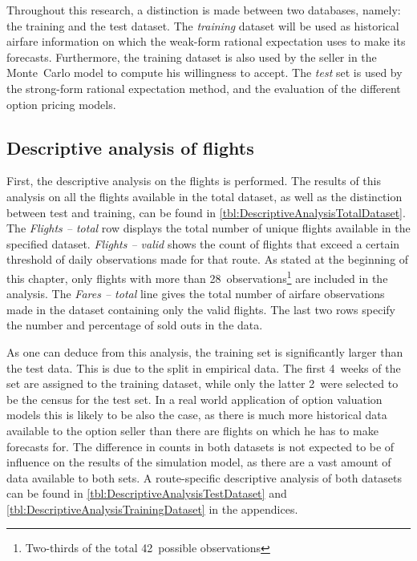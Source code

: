 Throughout this research, a distinction is made between two databases, namely: the training and the test dataset. The \emph{training} dataset will be used as historical airfare information on which the weak-form rational expectation uses to make its forecasts. Furthermore, the training dataset is also used by the seller in the Monte~Carlo model to compute his willingness to accept. The \emph{test} set is used by the strong-form rational expectation method, and the evaluation of the different option pricing models.

\subsection{Descriptive analysis of flights}
First, the descriptive analysis on the flights is performed. The results of this analysis on all the flights available in the total dataset, as well as the distinction between test and training, can be found in \autoref{tbl:DescriptiveAnalysisTotalDataset}. The \emph{Flights -- total} row displays the total number of unique flights available in the specified dataset. \emph{Flights -- valid} shows the count of flights that exceed a certain threshold of daily observations made for that route. As stated at the beginning of this chapter, only flights with more than 28~observations\footnote{Two-thirds of the total 42~possible observations} are included in the analysis. The \emph{Fares -- total} line gives the total number of airfare observations made in the dataset containing only the valid flights. The last two rows specify the number and percentage of sold outs in the data.

As one can deduce from this analysis, the training set is significantly larger than the test data. This is due to the split in empirical data. The first 4~weeks of the set are assigned to the training dataset, while only the latter 2~were selected to be the census for the test set. In a real world application of option valuation models this is likely to be also the case, as there is much more historical data available to the option seller than there are flights on which he has to make forecasts for. The difference in counts in both datasets is not expected to be of influence on the results of the simulation model, as there are a vast amount of data available to both sets. A route-specific descriptive analysis of both datasets can be found in \autoref{tbl:DescriptiveAnalysisTestDataset} and \autoref{tbl:DescriptiveAnalysisTrainingDataset} in the appendices.


